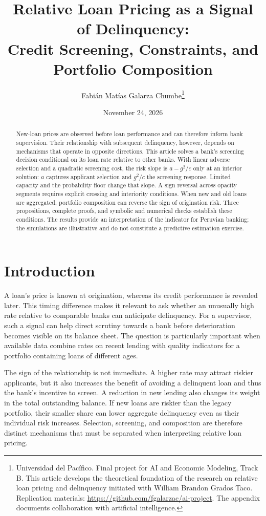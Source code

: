 \documentclass[11pt]{article}
\title{Relative Loan Pricing as a Signal of Delinquency:\\
\large Credit Screening, Constraints, and Portfolio Composition}
\author{Fabián Matías Galarza Chumbe\thanks{Universidad del Pacífico.
Final project for AI and Economic Modeling, Track B. This article develops
the theoretical foundation of the research on relative loan pricing and
delinquency initiated with William Brandon Grados Taco. Replication materials:
\url{https://github.com/fgalarzac/ai-project}. The appendix documents
collaboration with artificial intelligence.}}
\date{November 24, 2026}
\theoremstyle{definition}\newtheorem{assumption}{Assumption}
\begin{document}
\maketitle
\begin{abstract}
New-loan prices are observed before loan performance and can therefore
inform bank supervision. Their relationship with subsequent delinquency,
however, depends on mechanisms that operate in opposite directions. This
article solves a bank's screening decision conditional on its loan rate
relative to other banks. With linear adverse selection and a quadratic
screening cost, the risk slope is $a-g^2/c$ only at an interior solution:
$a$ captures applicant selection and $g^2/c$ the screening response.
Limited capacity and the probability floor change that slope. A sign reversal
across opacity segments requires explicit crossing and interiority conditions.
When new and old loans are aggregated, portfolio composition can reverse the
sign of origination risk. Three propositions, complete proofs, and symbolic
and numerical checks establish these conditions. The results provide an
interpretation of the indicator for Peruvian banking; the simulations are
illustrative and do not constitute a predictive estimation exercise.
\end{abstract}

\section{Introduction}
A loan's price is known at origination, whereas its credit performance is
revealed later. This timing difference makes it relevant to ask whether an
unusually high rate relative to comparable banks can anticipate delinquency.
For a supervisor, such a signal can help direct scrutiny towards a bank
before deterioration becomes visible on its balance sheet. The question is
particularly important when available data combine rates on recent lending
with quality indicators for a portfolio containing loans of different ages.

The sign of the relationship is not immediate. A higher rate may attract
riskier applicants, but it also increases the benefit of avoiding a delinquent
loan and thus the bank's incentive to screen. A reduction in new lending
also changes its weight in the total outstanding balance. If new loans are
riskier than the legacy portfolio, their smaller share can lower aggregate
delinquency even as their individual risk increases. Selection, screening,
and composition are therefore distinct mechanisms that must be separated
when interpreting relative loan pricing.
\end{document}
